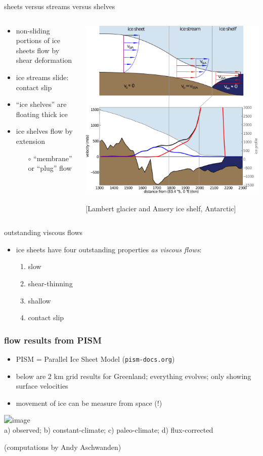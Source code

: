 \documentclass{beamer}
\newcommand{\contactslipslide}{
\begin{frame}{sheets versus streams versus shelves}

\begin{columns}
\begin{column}{0.35\textwidth}
\small
\begin{itemize}
\small
\item non-sliding portions of ice sheets flow by shear deformation
\item ice streams slide: \alert{contact slip}
\item ``ice shelves'' are floating thick ice
\item ice shelves flow by extension
  \begin{itemize}
  \scriptsize
  \item[$\circ$] ``membrane'' or ``plug'' flow
  \end{itemize}
\end{itemize}
\end{column}

\begin{column}{0.65\textwidth}
\includegraphics[width=1.1\textwidth]{siassacartoon-lambert}

\begin{center}
\vspace{-0.18in}
\tiny [Lambert glacier and Amery ice shelf, Antarctic]
\end{center}
\end{column}
\end{columns}
\end{frame}
}
\begin{document}
\contactslipslide


\begin{frame}{outstanding viscous flows}

\begin{itemize}
\item ice sheets have four outstanding properties \emph{as viscous flows}:
  \begin{enumerate}
  \item \alert{slow}
  \item \alert{shear-thinning}
  \item \alert{shallow}
  \item \alert{contact slip}
  \end{enumerate}
\end{itemize}
\end{frame}


\begin{frame}
  \frametitle{flow results from PISM}

\begin{itemize}
\item PISM = Parallel Ice Sheet Model (\texttt{pism-docs.org})
\item below are 2 km grid results for Greenland; everything evolves; only showing surface velocities
\item movement of ice can be measure from space (!)
\end{itemize}

\vspace{-0.1in}
\begin{center}
    \includegraphics<1>[height=4.2cm]{speed_sar_pism_all} \\
   \footnotesize{a) observed; b) constant-climate; c) paleo-climate; d) flux-corrected}

\medskip
\tiny (computations by Andy Aschwanden)
\end{center}
\end{frame}
\end{document}
